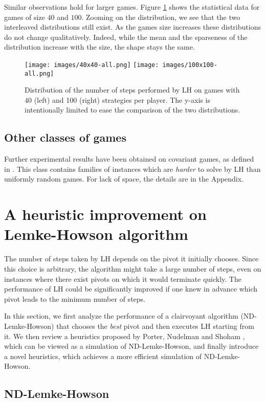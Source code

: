 \documentclass[11pt]{article}
\begin{document}
Similar observations hold for larger games. Figure \ref{step_dist_2}
shows the statistical data for games of size $40$ and $100$. Zooming
on the distribution, we see that the two interleaved distributions
still exist. As the games size increases these distributions do not
change qualitatively. Indeed, while the mean and the sparseness of
the distribution increase with the size, the shape stays the same.
\begin{figure}[h]
\centering
\texttt{[image: images/40x40-all.png]}
\texttt{[image: images/100x100-all.png]}
\caption{Distribution of the number of steps performed by LH on
games with 40 (left) and 100 (right) strategies per player. The y-axis is
intentionally limited to ease the comparison of the two
distributions.} \label{step_dist_2}
\end{figure}

\subsection{Other classes of games}

Further experimental results have been obtained on covariant games,
as defined in \cite{covariance}. This class contains families of
instances which are \emph{harder} to solve by LH than uniformly
random games. For lack of space, the details are in the Appendix.

\section{A heuristic improvement on Lemke-Howson algorithm}

The number of steps taken by LH depends on the pivot it initially
chooses. Since this choice is arbitrary, the algorithm might take a
large number of steps, even on instances where there exist pivots on
which it would terminate quickly. The performance of LH could be
significantly improved if one knew in advance which pivot
leads to the minimum number of steps.

In this section, we first analyze the performance of a clairvoyant
algorithm (ND-Lemke-Howson) that chooses the \emph{best} pivot and
then executes LH starting from it. We then review a heuristics
proposed by Porter, Nudelman and Shoham \cite{simple}, which can be
viewed as a simulation of ND-Lemke-Howson, and finally
introduce a novel heuristics, which achieves a more efficient
simulation of ND-Lemke-Howson.

\subsection{ND-Lemke-Howson}
\end{document}
